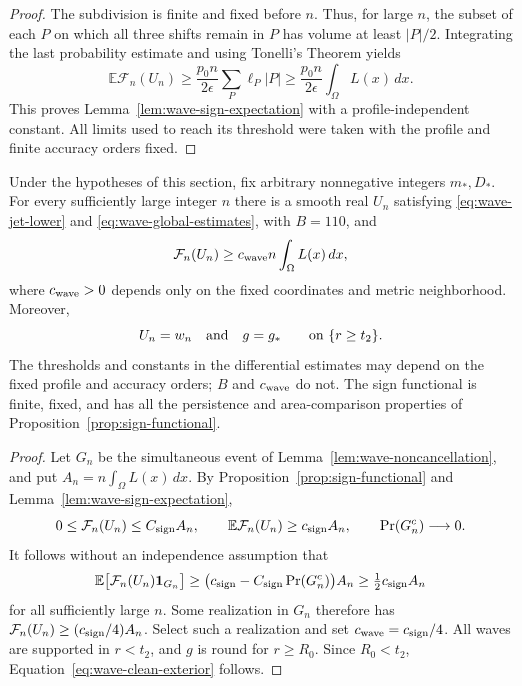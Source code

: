 \begin{proof}
The subdivision is finite and fixed before $n$.  Thus, for large $n$,
the subset of each $P$ on which all three shifts remain in $P$ has
volume at least $|P|/2$.  Integrating the last probability estimate
and using Tonelli's Theorem yields
\[
 \mathbb E\mathcal F_n(U_n)
 \ge\frac{p_0 n}{2\epsilon}\sum_P\ell_P|P|
 \ge\frac{p_0 n}{2\epsilon}\int_\Omega L(x)\,dx.
\]
This proves Lemma~\ref{lem:wave-sign-expectation} with a profile-independent constant.  All
limits used to reach its threshold were taken with the profile and
finite accuracy orders fixed.
\end{proof}

\begin{proposition}
\label{prop:wave-superposition}
\label{prop:wave-realization}
Under the hypotheses of this section, fix arbitrary nonnegative
integers $m_*,D_*$.  For every sufficiently large integer $n$ there
is a smooth real $U_n$ satisfying
\eqref{eq:wave-jet-lower} and
\eqref{eq:wave-global-estimates}, with $B=110$, and
\begin{equation}
 \mathcal F_n(U_n)\ge
       c_{\rm wave} n\int_\Omega L(x)\,dx,
 \label{eq:wave-sign-lower}
\end{equation}
where $c_{\rm wave}>0$ depends only on the fixed coordinates and
metric neighborhood.  Moreover,
\begin{equation}
 U_n=w_n\quad\hbox{and}\quad g=g_*
       \qquad\hbox{on }\{r\ge t_2\}.
 \label{eq:wave-clean-exterior}
\end{equation}
The thresholds and constants in the differential estimates may
depend on the fixed profile and accuracy orders; $B$ and
$c_{\rm wave}$ do not.  The sign functional is finite, fixed, and
has all the persistence and area-comparison properties of
Proposition~\ref{prop:sign-functional}.
\end{proposition}

\begin{proof}
Let $G_n$ be the simultaneous event of
Lemma~\ref{lem:wave-noncancellation}, and put
$A_n=n\int_\Omega L(x)\,dx$.  By
Proposition~\ref{prop:sign-functional} and
Lemma~\ref{lem:wave-sign-expectation},
\[
 0\le\mathcal F_n(U_n)\le C_{\rm sign}A_n,
 \qquad \mathbb E\mathcal F_n(U_n)\ge c_{\rm sign}A_n,
 \qquad \Pr(G_n^c)\longrightarrow0.
\]
It follows without an independence assumption that
\[
 \mathbb E\bigl[\mathcal F_n(U_n)\mathbf1_{G_n}\bigr]
 \ge\bigl(c_{\rm sign}-C_{\rm sign}\Pr(G_n^c)\bigr)A_n
 \ge\tfrac12c_{\rm sign}A_n
\]
for all sufficiently large $n$.  Some realization in $G_n$ therefore
has $\mathcal F_n(U_n)\ge(c_{\rm sign}/4)A_n$.  Select such a
realization and set $c_{\rm wave}=c_{\rm sign}/4$.
All waves are supported in $r<t_2$, and $g$ is round for $r\ge R_0$.
Since $R_0<t_2$, Equation~\eqref{eq:wave-clean-exterior} follows.
\end{proof}

